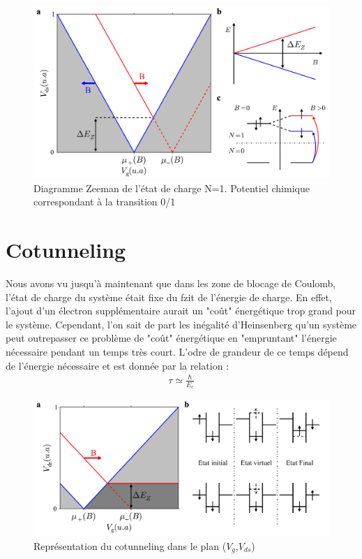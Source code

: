 \begin{figure}
\includegraphics[scale=0.5]{Theorie/Transport/figure4/figure4.pdf} 
\caption{Diagramme Zeeman de l'état de charge N=1. Potentiel chimique correspondant à la transition 0/1}
\label{charge_discharge}
\end{figure}

\section{Cotunneling}
Nous avons vu jusqu'à maintenant que dans les zone de blocage de Coulomb, l'état de charge du système était fixe du fzit de l'énergie de charge. En effet, l'ajout d'un électron supplémentaire aurait un "co\^ut" énergétique trop grand pour le système. Cependant, l'on sait de part les inégalité d'Heinsenberg qu'un système peut outrepasser ce problème de "co\^ut" énergétique en "empruntant" l'énergie nécessaire pendant un temps très court. L'odre de grandeur de ce temps dépend de l'énergie nécessaire et est donnée par la relation :
\begin{eqnarray}
\tau \simeq \frac{\hbar}{E_c} \nonumber
\end{eqnarray}


\begin{figure}
\includegraphics[scale=0.5]{Theorie/Transport/figure5/figure5.pdf} 
\caption{Représentation du cotunneling dans le plan ($V_g$,$V_{ds}$)}
\label{charge_discharge}
\end{figure}


